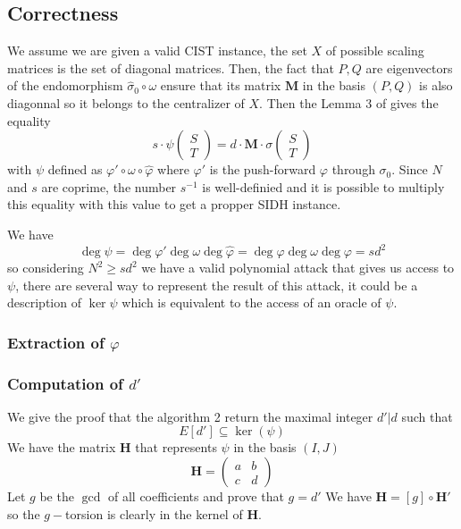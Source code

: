 \documentclass[12pt,a4paper]{article}
\begin{document}
				\subsection{Correctness}
				We assume we are given a valid CIST instance, the set $X$ of possible scaling matrices is the
				set of diagonal matrices. Then, the fact that $P,Q$ are eigenvectors of the
				endomorphism $\widehat\sigma_0\circ\omega$ ensure that its matrix  $\mathbf M$ in the basis $(P,Q)$
			is also diagonnal so it belongs to the centralizer of $X$. Then the Lemma 3 of \cite{polyCIST} gives
			the equality  \[
			s\cdot\psi\begin{pmatrix} S \\ T \end{pmatrix} = d\cdot\mathbf M\cdot\sigma\begin{pmatrix}
		S \\ T \end{pmatrix} 
			\] 
			with $\psi$ defined as $\varphi'\circ\omega\circ\widehat\varphi$ where $\varphi'$ is the
			push-forward $\varphi$ through $\sigma_0$. 
			Since $N$ and $s$ are coprime, the number $s^{-1}$ is well-definied and it is possible to multiply
			this equality with this value to get a propper SIDH instance.

			We have $$\deg\psi=\deg\varphi'\deg\omega\deg\widehat\varphi=\deg\varphi\deg\omega\deg\varphi=sd^{2}$$
			so considering $N^2\geq sd^2$ we have a valid polynomial attack that gives us access to $\psi$,
			there are several way to represent the result of this attack, it could be a description of
			$\ker\psi$ which is equivalent to the access of an oracle of $\psi$.

			\subsubsection{Extraction of $\varphi$}
			
			\subsubsection{Computation of $d'$}
			We give the proof that the algorithm 2 return the maximal integer $d'|d$ such that \[
				E[d']\subseteq \ker(\psi)
			\] 
			We have the matrix $\mathbf H$ that represents $\psi$ in the basis $(I,J)$ %
			 \[
				 \mathbf H = \begin{pmatrix} a &  b \\ c & d \end{pmatrix} 
			\] 
			Let $g$ be the $\gcd$ of all coefficients and prove that $g = d'$
			We have $\mathbf H	= [g]\circ\mathbf H'$ so the $g-$torsion is clearly in the kernel of $\mathbf
			H$.
			
\end{document}

